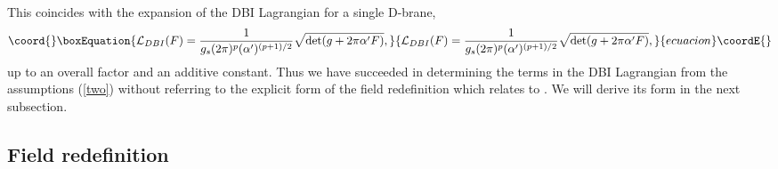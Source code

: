 \documentclass[a4paper,12pt]{article}
\begin{document}
This coincides with the \coordHE{} expansion of
the DBI Lagrangian for a single D\coordHE{}-brane,
\begin{equation}\coord{}\boxEquation{
{\cal L}_{DBI} (F) =
\frac{1}{g_s (2 \pi)^p (\alpha')^{(p+1)/2}}
\sqrt{\det (g + 2 \pi \alpha' F)},
\label{DBI}
}{
{\cal L}_{DBI} (F) =
\frac{1}{g_s (2 \pi)^p (\alpha')^{(p+1)/2}}
\sqrt{\det (g + 2 \pi \alpha' F)},
}{ecuacion}\coordE{}\end{equation}
up to an overall factor and an additive constant.
Thus we have succeeded in determining the \coordHE{} terms
in the DBI Lagrangian from the assumptions (\ref{two})
without referring to the explicit form of the field redefinition
which relates \coordHE{} to \coordHE{}.
We will derive its form in the next subsection.

\subsection{Field redefinition}
\indent
\end{document}
